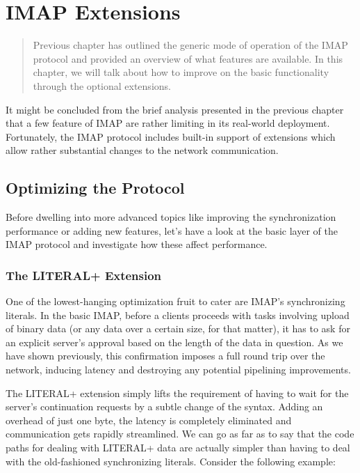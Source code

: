 \documentclass[trojita]{subfiles}
\begin{document}
\chapter{IMAP Extensions}
\label{sec:imap-extensions}

\begin{abstract}
  Previous chapter has outlined the generic mode of operation of the IMAP protocol and provided an overview of what
  features are available.  In this chapter, we will talk about how to improve on the basic functionality through the
  optional extensions.
\end{abstract}

It might be concluded from the brief analysis presented in the previous chapter that a few feature of IMAP are rather
limiting in its real-world deployment.  Fortunately, the IMAP protocol includes built-in support of extensions which
allow rather substantial changes to the network communication.

\section{Optimizing the Protocol}

Before dwelling into more advanced topics like improving the synchronization performance or adding new features, let's
have a look at the basic layer of the IMAP protocol and investigate how these affect performance.

\subsection{The LITERAL+ Extension}

One of the lowest-hanging optimization fruit to cater are IMAP's synchronizing literals.  In the basic IMAP, before a
clients proceeds with tasks involving upload of binary data (or any data over a certain size, for that matter), it has
to ask for an explicit server's approval based on the length of the data in question.  As we have shown previously, this
confirmation imposes a full round trip over the network, inducing latency and destroying any potential pipelining
improvements.

The LITERAL+ extension simply lifts the requirement of having to wait for the server's continuation requests by a subtle
change of the syntax.  Adding an overhead of just one byte, the latency is completely eliminated and communication gets
rapidly streamlined.  We can go as far as to say that the code paths for dealing with LITERAL+ data are actually simpler
than having to deal with the old-fashioned synchronizing literals.  Consider the following example:
\end{document}
